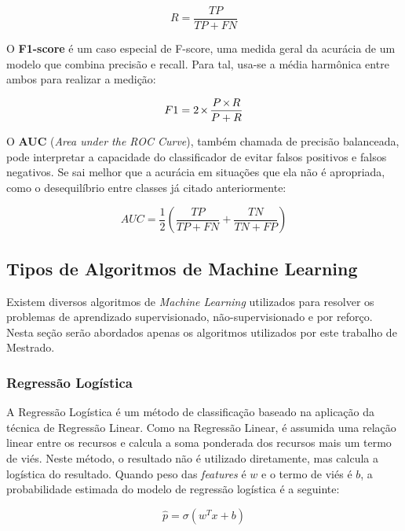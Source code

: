 \documentclass[portugues]{ic-tese}
\let\oldtimes\times
\def\times{{\mkern1mu\oldtimes\mkern1mu}}
\begin{document}
\begin{equation}
R = \frac{TP}{TP + FN}
\end{equation}

O \textbf{F1-score} é um caso especial de F-score, uma medida geral da acurácia de um modelo que combina precisão e recall. Para tal, usa-se a média harmônica entre ambos para realizar a medição:

\begin{equation}
F1 = 2 \times\frac{P \times R}{P + R}
\end{equation}

O \textbf{AUC} (\textit{Area under the ROC Curve}), também chamada de precisão balanceada, pode interpretar a capacidade do classificador de evitar falsos positivos e falsos negativos. Se sai melhor que a acurácia em situações que ela não é apropriada, como o desequilíbrio entre classes já citado anteriormente:

\begin{equation}
AUC = \frac{1}{2} \left( \frac{TP}{TP + FN} + \frac{TN}{TN + FP} \right)
\end{equation}

\subsection{Tipos de Algoritmos de Machine Learning}
\label{sec:MLAlgorithms}

Existem diversos algoritmos de \textit{Machine Learning} utilizados para resolver os problemas de aprendizado supervisionado, não-supervisionado e por reforço. Nesta seção serão abordados apenas os algoritmos utilizados por este trabalho de Mestrado.

\subsubsection{Regressão Logística}

A Regressão Logística é um método de classificação baseado na aplicação da técnica de Regressão Linear. Como na Regressão Linear, é assumida uma relação linear entre os recursos e calcula a soma ponderada dos recursos mais um termo de viés. Neste método, o resultado não é utilizado diretamente, mas calcula a logística do resultado. Quando peso das \textit{features} é $w$ e o termo de viés é $b$, a probabilidade estimada do modelo de regressão logística é a seguinte:

\begin{equation}
\hat{p} = \sigma (w^{T}x + b)
\end{equation}
\end{document}
